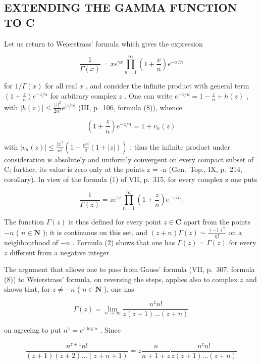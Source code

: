 \subsection{EXTENDING THE GAMMA FUNCTION TO C}

Let us return to Weierstrass' formula which gives the expression

\[
\frac {1}{\Gamma (x)} = x e ^ {\gamma x} \prod_ {n = 1} ^ {\infty} \left(1 + \frac {x}{n}\right) e ^ {- x / n}\tag{1}
\]

for \(1 / \Gamma (x)\) for all real \(x\) , and consider the infinite product with general term \(\left(1 + \frac{z}{n}\right)e^{-z / n}\) for arbitrary complex \(z\) . One can write \(e^{-z / n} = 1 - \frac{z}{n} + h(z)\) , with \(|h(z)| \leqslant \frac{|z|^2}{2n^2} e^{|z / n|}\) (III, p.~106, formula (8)), whence

\[
\left(1 + \frac {z}{n}\right) e ^ {- z / n} = 1 + v _ {n} (z)
\]

with \(|v_{n}(z)| \leqslant \frac{|z|^{2}}{n^{2}}\left(1 + \frac{e^{|z|}}{2}(1 + |z|)\right)\) ; thus the infinite product under consideration is absolutely and uniformly convergent on every compact subset of C; further, its value is zero only at the points z = -n (Gen.~Top., IX, p.~214, corollary). In view of the formula (1) of VII, p.~315, for every complex z one puts

\[
\frac {1}{\Gamma (z)} = z e ^ {\gamma z} \prod_ {n = 1} ^ {\infty} \left(1 + \frac {z}{n}\right) e ^ {- z / n}.\tag{2}
\]

The function \(\Gamma(z)\) is thus defined for every point \(z \in \mathbf{C}\) apart from the points \(-n\) ( \(n \in \mathbf{N}\) ); it is continuous on this set, and \((z + n)\Gamma(z) \sim \frac{(-1)^n}{n!}\) on a neighbourhood of \(-n\) . Formula (2) shows that one has \(\Gamma(\overline{z}) = \overline{\Gamma(z)}\) for every \(z\) different from a negative integer.

The argument that allows one to pass from Gauss' formula (VII, p.~307, formula (8)) to Weierstrass' formula, on reversing the steps, applies also to complex \(z\) and shows that, for \(z \neq -n\) ( \(n \in \mathbf{N}\) ), one has

\[
\Gamma (z) = \lim _ {n \rightarrow \infty} \frac {n ^ {z} n !}{z (z + 1) \dots (z + n)}\tag{3}
\]

on agreeing to put \(n^z = e^{z\log n}\) . Since

\[
\frac {n ^ {z + 1} n !}{(z + 1) (z + 2) \dots (z + n + 1)} = z \frac {n}{n + 1 + z} \frac {n ^ {z} n !}{z (z + 1) \dots (z + n)}
\]

